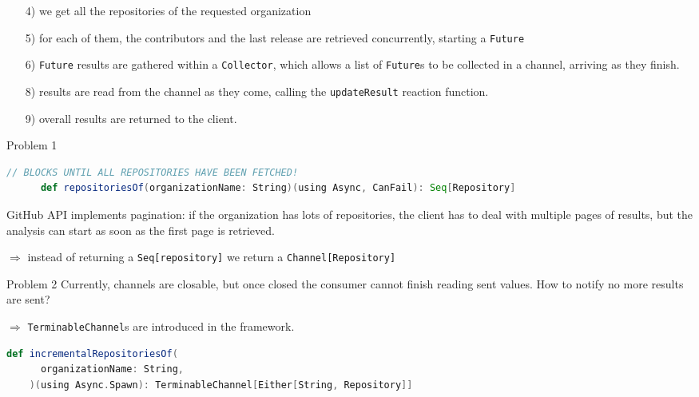 \documentclass[aspectratio=1610,xcolor=dvipsnames]{beamer}
\begin{document}
%
\begin{frame}
  
  \footnotesize
  \begin{enumerate}
      \item[4)] we get all the repositories of the requested organization
      \item[5)] for each of them, the contributors and the last release are retrieved concurrently, starting a \texttt{Future}
      \item[6)] \texttt{Future} results are gathered within a \texttt{Collector}, which allows a list of \texttt{Future}s to be collected in a channel, arriving as they finish.
      \item[8)] results are read from the channel as they come, calling the \texttt{updateResult} reaction function.
      \item[9)] overall results are returned to the client.
  \end{enumerate}
\end{frame}
%
\begin{frame}[fragile]
  \begin{alertblock}{Problem 1}
    \begin{lstlisting}[language=scala, gobble=6]
      // BLOCKS UNTIL ALL REPOSITORIES HAVE BEEN FETCHED!
      def repositoriesOf(organizationName: String)(using Async, CanFail): Seq[Repository]
    \end{lstlisting}
    \small
    GitHub API implements pagination: if the organization has lots of repositories, the client has to deal with multiple pages of results, but the analysis can start as soon as the first page is retrieved.
  \end{alertblock}
  \pause
  \small$\Rightarrow$ instead of returning a \texttt{Seq[repository]} we return a \texttt{Channel[Repository]}
  \pause
  \begin{alertblock}{Problem 2}
      \small
      Currently, channels are closable, but once closed the consumer cannot finish reading sent values. How to notify no more results are sent?
  \end{alertblock}
  \pause
  \small$\Rightarrow$ \texttt{TerminableChannel}s are introduced in the framework.
  \begin{lstlisting}[language=scala, gobble=4]
    def incrementalRepositoriesOf(
      organizationName: String,
    )(using Async.Spawn): TerminableChannel[Either[String, Repository]]
  \end{lstlisting}
\end{frame}
\end{document}
